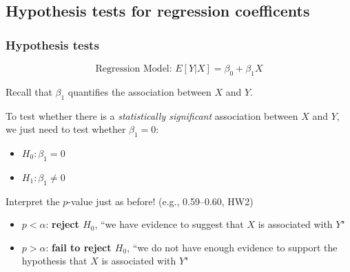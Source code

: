 \documentclass[12pt, 
hyperref={colorlinks=true, linkcolor=blue, urlcolor=cyan},dvipsnames]{beamer}
\begin{document}
\subsection{Hypothesis tests for regression coefficents}
\begin{frame}
\frametitle{Hypothesis tests}

$$\text{Regression Model: } E[Y|X] = \beta_0 + \beta_1 X$$

Recall that $\beta_1$ quantifies the association between $X$ and $Y$.

To test whether there is a \textit{statistically significant} association between $X$ and $Y$, \color{blue} we just need to test whether $\beta_1 = 0$: \vspace{-0.3cm} \color{black}
\begin{itemize}
\item $H_0: \beta_1 = 0$
\item $H_1: \beta_1 \not= 0$
\end{itemize}

\pause
Interpret the $p$-value just as before! (e.g., 0.59--0.60, HW2) \vspace{-0.4cm}
\begin{small}
\begin{itemize} \itemsep -2pt
\item $p < \alpha$: \textbf{reject $H_0$}, ``we have evidence to suggest that $X$ is associated with $Y$"
\item $p > \alpha$: \textbf{fail to reject $H_0$}, ``we do not have enough evidence to support the hypothesis that $X$ is associated with $Y$"
\end{itemize}
\end{small}
\end{frame}

\end{document}
